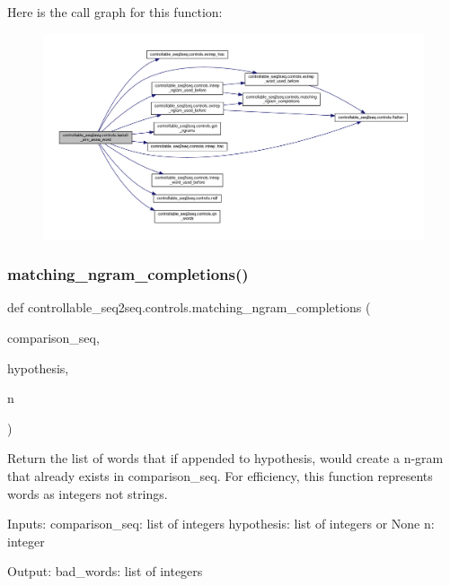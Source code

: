Here is the call graph for this function\+:
\nopagebreak
\begin{figure}[H]
\begin{center}
\leavevmode
\includegraphics[width=350pt]{namespacecontrollable__seq2seq_1_1controls_ae87a6983e2e8bfd8a5eaa33973c6acc3_cgraph}
\end{center}
\end{figure}
\mbox{\label{namespacecontrollable__seq2seq_1_1controls_a4c775d3518037c2505c0bb4a69bb1dd5}} 
\subsubsection{\texorpdfstring{matching\+\_\+ngram\+\_\+completions()}{matching\_ngram\_completions()}}
{\footnotesize\ttfamily def controllable\+\_\+seq2seq.\+controls.\+matching\+\_\+ngram\+\_\+completions (\begin{DoxyParamCaption}\item[{}]{comparison\+\_\+seq,  }\item[{}]{hypothesis,  }\item[{}]{n }\end{DoxyParamCaption})}

\begin{DoxyVerb}Return the list of words that if appended to hypothesis, would create a n-gram that
already exists in comparison_seq. For efficiency, this function represents words
as integers not strings.

Inputs:
    comparison_seq: list of integers
    hypothesis: list of integers or None
    n: integer

Output:
    bad_words: list of integers
\end{DoxyVerb}
 

